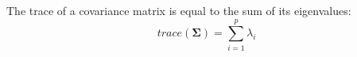 \begin{theorem}
\label{th:eigentrace}
The trace of a covariance matrix is equal to the sum of its eigenvalues:
\begin{equation}
\label{eigentrace}
trace(\boldsymbol{\Sigma}) = \sum_{i=1}^{p} \lambda_{i}
\end{equation}
\end{theorem}